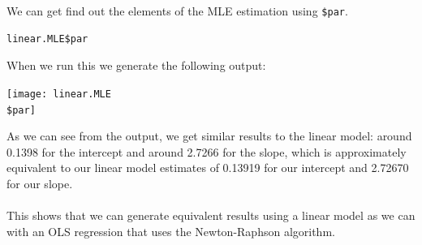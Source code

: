 \documentclass[12pt,letterpaper]{article}
\begin{document}
\noindent We can get find out the elements of the MLE estimation using \texttt{\$par}.

\begin{lstlisting}
linear.MLE$par
\end{lstlisting}

\noindent When we run this we generate the following output:

\texttt{[image: linear.MLE\\\$par]}

\noindent As we can see from the output, we get similar results to the linear model: around 0.1398 for the intercept and around 2.7266 for the slope, which is approximately equivalent to our linear model estimates of 0.13919 for our intercept and 2.72670 for our slope.
\\\\
\noindent This shows that we can generate equivalent results using a linear model as we can with an OLS regression that uses the Newton-Raphson algorithm.
\end{document}
